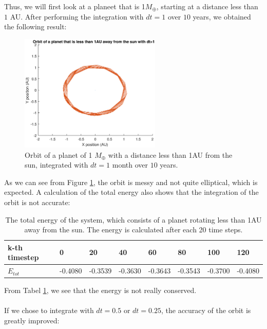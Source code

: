 Thus, we will first look at a planeet that is 1$M_{\oplus}$, starting at a distance less than $1$ AU. After performing the integration with $dt=1$ over $10$ years, we obtained the following result:\\
\begin{figure}[H]
\centering
\includegraphics[width=0.6\textwidth]{Planeet_1AU_dt1_10jaar.eps}
\caption{Orbit of a planet of 1 $M_{\oplus}$ with a distance less than 1AU from the sun, integrated with $dt=1$ month over $10$ years.}
    \label{fig:Planet1AUdt1}
\end{figure}
As we can see from Figure \ref{fig:Planet1AUdt1}, the orbit is messy and not quite elliptical, which is expected. A calculation of the total energy also shows that the integration of the orbit is not accurate:\\
\begin{table}[htb]
\centering
\caption{The total energy of the system, which consists of a planet rotating less than 1AU away from the sun. The energy is calculated after each 20 time steps.}
\begin{tabular}{|l|l|l|l|l|l|l|l|}
\hline
k-th timestep&0&20&40&60&80&100&120\\ \hline
$E_{tot}$&-0.4080& -0.3539&   -0.3630&   -0.3643&   -0.3543&-0.3700&-0.4080\\ \hline
\end{tabular}
\label{tab:Planet1AUEnergy}
\end{table}
\newline
From Tabel \ref{tab:Planet1AUEnergy}, we see that the energy is not really conserved.\\
\\
If we chose to integrate with $dt=0.5$ or $dt=0.25$, the accuracy of the orbit is greatly improved:
